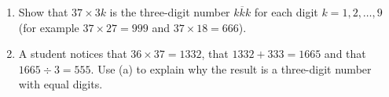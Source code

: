 \begin{enumerate}
\item[(a)] Show that $37\times3k$ is the three-digit number $\overline{kkk}$ for each digit $k=1,2,\dots,9$ (for example $37\times27=999$ and $37\times18=666$).
\item[(b)] A student notices that $36\times37=1332$, that $1332+333=1665$ and that $1665\div3=555$. Use (a) to explain why the result is a three-digit number with equal digits.
\end{enumerate}
